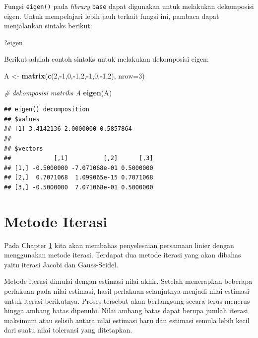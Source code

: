 \documentclass[]{book}
\newenvironment{Shaded}{\begin{snugshade}}{\end{snugshade}}
\newcommand{\CommentTok}[1]{\textcolor[rgb]{0.56,0.35,0.01}{\textit{#1}}}
\newcommand{\DataTypeTok}[1]{\textcolor[rgb]{0.13,0.29,0.53}{#1}}
\newcommand{\DecValTok}[1]{\textcolor[rgb]{0.00,0.00,0.81}{#1}}
\newcommand{\KeywordTok}[1]{\textcolor[rgb]{0.13,0.29,0.53}{\textbf{#1}}}
\newcommand{\NormalTok}[1]{#1}
\newcommand{\OperatorTok}[1]{\textcolor[rgb]{0.81,0.36,0.00}{\textbf{#1}}}
\newcommand{\StringTok}[1]{\textcolor[rgb]{0.31,0.60,0.02}{#1}}
\theoremstyle{definition}
\theoremstyle{definition}
\theoremstyle{definition}
\theoremstyle{remark}
\begin{document}
Fungsi \texttt{eigen()} pada \emph{library} \texttt{base} dapat digunakan untuk melakukan dekomposisi eigen. Untuk mempelajari lebih jauh terkait fungsi ini, pambaca dapat menjalankan sintaks berikut:

\begin{Shaded}
\begin{Highlighting}[]
\NormalTok{?eigen}
\end{Highlighting}
\end{Shaded}

Berikut adalah contoh sintaks untuk melakukan dekomposisi eigen:

\begin{Shaded}
\begin{Highlighting}[]
\NormalTok{A <-}\StringTok{ }\KeywordTok{matrix}\NormalTok{(}\KeywordTok{c}\NormalTok{(}\DecValTok{2}\NormalTok{,}\OperatorTok{-}\DecValTok{1}\NormalTok{,}\DecValTok{0}\NormalTok{,}\OperatorTok{-}\DecValTok{1}\NormalTok{,}\DecValTok{2}\NormalTok{,}\OperatorTok{-}\DecValTok{1}\NormalTok{,}\DecValTok{0}\NormalTok{,}\OperatorTok{-}\DecValTok{1}\NormalTok{,}\DecValTok{2}\NormalTok{), }\DataTypeTok{nrow=}\DecValTok{3}\NormalTok{)}

\CommentTok{# dekomposisi matriks A}
\KeywordTok{eigen}\NormalTok{(A)}
\end{Highlighting}
\end{Shaded}

\begin{verbatim}
## eigen() decomposition
## $values
## [1] 3.4142136 2.0000000 0.5857864
## 
## $vectors
##            [,1]          [,2]      [,3]
## [1,] -0.5000000 -7.071068e-01 0.5000000
## [2,]  0.7071068  1.099065e-15 0.7071068
## [3,] -0.5000000  7.071068e-01 0.5000000
\end{verbatim}

\hypertarget{iteratif}{%
\section{Metode Iterasi}\label{iteratif}}

Pada Chapter \ref{iteratif} kita akan membahas penyelesaian persamaan linier dengan menggunakan metode iterasi. Terdapat dua metode iterasi yang akan dibahas yaitu iterasi Jacobi dan Gauss-Seidel.

Metode iterasi dimulai dengan estimasi nilai akhir. Setelah menerapkan beberapa perlakuan pada nilai estimasi, hasil perlakuan selanjutnya menjadi nilai estimasi untuk iterasi berikutnya. Proses tersebut akan berlangsung secara terus-menerus hingga ambang batas dipenuhi. Nilai ambang batas dapat berupa jumlah iterasi maksimum atau selisih antara nilai estimasi baru dan estimasi semula lebih kecil dari suatu nilai toleransi yang ditetapkan.
\end{document}
